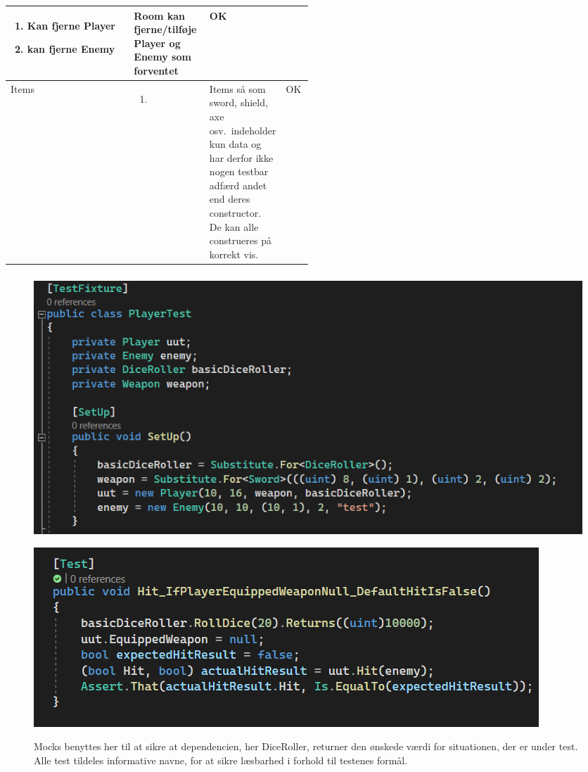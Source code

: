 \begin{center}
\begin{longtable}{|l|p{0.25\linewidth}|p{0.25\linewidth}|l|}
\begin{enumerate}
    \item Kan fjerne Player
    \item kan fjerne Enemy
  \end{enumerate}
  &
  \flushleft
  Room kan fjerne/tilføje Player og Enemy som forventet
  &
  OK
  \\ \hline
  Items
  &
  \begin{enumerate}
    \item[]
  \end{enumerate}
  &
  \flushleft
  Items så som sword, shield, axe osv.\ indeholder kun data og har derfor ikke nogen
  testbar adfærd andet end deres constructor. De kan alle construeres på korrekt vis.
  &
  OK
  \\ \hline
\end{longtable}
\addtocounter{table}{-1}
\end{center}

\newpage 

\subsubsection{}

\begin{figure}[h]
  \centering
  \caption{}
  \includegraphics[scale=0.5]{02-Body/Images/Mocks_And_Dependency_Injection.png}
  \label{fig:mock}
\end{figure}

\begin{figure}[h]
  \centering
  \caption{Mocks benyttes her til at sikre at dependencien, her DiceRoller, returner
           den ønskede værdi for situationen, der er under test.
           Alle test tildeles informative navne, for at sikre læsbarhed i forhold 
           til testenes formål.}
  \includegraphics[scale=0.5]{02-body/Images/useofmocks.png}
  \label{fig:mockuse}
\end{figure}

